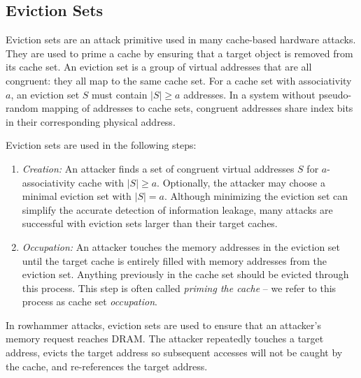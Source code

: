 \documentclass[letterpaper, twocolumn]{article}
\begin{document}

\date{}

\subsection{Eviction Sets}
Eviction sets are an attack primitive used in many cache-based hardware attacks.
They are used to prime a cache by ensuring that a target object is removed from its cache set.
An eviction set is a group of virtual addresses that are all congruent: they all map to the same cache set.
For a cache set with associativity $a$, an eviction set $S$ must contain $|S| \geq a$ addresses.
In a system without pseudo-random mapping of addresses to cache sets, congruent addresses share index bits in their
corresponding physical address.


Eviction sets are used in the following steps:

\begin{enumerate}
    \item \textit{Creation:} An attacker finds a set of congruent virtual addresses $S$ for $a$-associativity cache with $|S| \geq a$. Optionally, the attacker may choose a minimal eviction set with $|S|=a$.
    Although minimizing the eviction set can simplify the accurate detection of information leakage,
    many attacks are successful with eviction sets larger than their target caches.

    \item \textit{Occupation:} An attacker touches the memory addresses in the eviction set until the target cache is entirely filled with memory addresses from the eviction set.
    Anything previously in the cache set should be evicted through this process.
    This step is often called \textit{priming the cache} – we refer to this process as cache set \textit{occupation}.
\end{enumerate}

In rowhammer attacks, eviction sets are used to ensure that an attacker's memory request reaches DRAM.
The attacker repeatedly touches a target address, evicts the target address so subsequent accesses will not be caught by the cache,
and re-references the target address.
\end{document}
